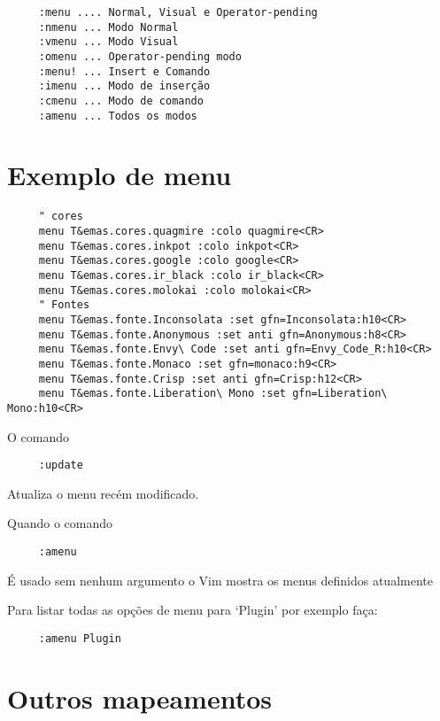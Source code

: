 \begin{verbatim}
     :menu .... Normal, Visual e Operator-pending
     :nmenu ... Modo Normal
     :vmenu ... Modo Visual
     :omenu ... Operator-pending modo
     :menu! ... Insert e Comando
     :imenu ... Modo de inserção
     :cmenu ... Modo de comando
     :amenu ... Todos os modos
\end{verbatim}

\section{Exemplo de menu}
\label{Exemplo de menu}

\begin{verbatim}
     " cores
     menu T&emas.cores.quagmire :colo quagmire<CR>
     menu T&emas.cores.inkpot :colo inkpot<CR>
     menu T&emas.cores.google :colo google<CR>
     menu T&emas.cores.ir_black :colo ir_black<CR>
     menu T&emas.cores.molokai :colo molokai<CR>
     " Fontes
     menu T&emas.fonte.Inconsolata :set gfn=Inconsolata:h10<CR>
     menu T&emas.fonte.Anonymous :set anti gfn=Anonymous:h8<CR>
     menu T&emas.fonte.Envy\ Code :set anti gfn=Envy_Code_R:h10<CR>
     menu T&emas.fonte.Monaco :set gfn=monaco:h9<CR>
     menu T&emas.fonte.Crisp :set anti gfn=Crisp:h12<CR>
     menu T&emas.fonte.Liberation\ Mono :set gfn=Liberation\ Mono:h10<CR>
\end{verbatim}

O comando

\begin{verbatim}
     :update
\end{verbatim}

Atualiza o menu recém modificado.

Quando o comando

\begin{verbatim}
     :amenu
\end{verbatim}

É usado sem nenhum argumento o Vim mostra os menus definidos atualmente

Para listar todas as opções de menu para `Plugin' por exemplo faça:

\begin{verbatim}
     :amenu Plugin
\end{verbatim}

\section{Outros mapeamentos}
\label{Outros mapeamentos}

